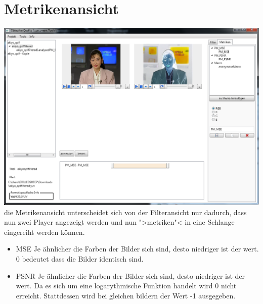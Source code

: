 \chapter{Metrikenansicht}
\includegraphics[scale=0.55]{bilder/Metriken.png}\\[5ex]
die Metrikenansicht unterscheidet sich von der Filteransicht nur dadurch, dass nun zwei Player angezeigt werden und nun ">metriken"< in eine Schlange eingereiht werden können.
\begin{itemize}
\item MSE \newline
Je ähnlicher die Farben der Bilder sich sind, desto niedriger ist der wert. 0 bedeutet dass die Bilder identisch sind.
\item PSNR \newline
Je ähnlicher die Farben der Bilder sich sind, desto niedriger ist der wert. Da es sich um eine logarythmische Funktion handelt wird 0 nicht erreicht. Stattdessen wird bei gleichen bildern der Wert -1 ausgegeben.
\end{itemize}
